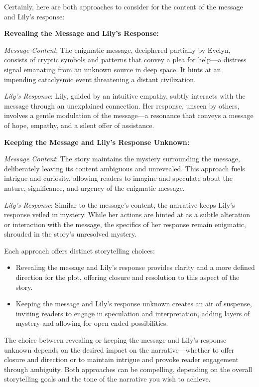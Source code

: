 \begin{aquote}
    Certainly, here are both approaches to consider for the content of the message and Lily's response:\medskip

    \noindent\textbf{Revealing the Message and Lily's Response:}\smallskip

    \emph{Message Content}: The enigmatic message, deciphered partially by Evelyn, consists of cryptic symbols and patterns that convey a plea for help—a distress signal emanating from an unknown source in deep space. It hints at an impending cataclysmic event threatening a distant civilization.\smallskip

    \emph{Lily's Response}: Lily, guided by an intuitive empathy, subtly interacts with the message through an unexplained connection. Her response, unseen by others, involves a gentle modulation of the message—a resonance that conveys a message of hope, empathy, and a silent offer of assistance.\medskip

    \noindent\textbf{Keeping the Message and Lily's Response Unknown:}\smallskip

    \emph{Message Content}: The story maintains the mystery surrounding the message, deliberately leaving its content ambiguous and unrevealed. This approach fuels intrigue and curiosity, allowing readers to imagine and speculate about the nature, significance, and urgency of the enigmatic message.\smallskip

    \emph{Lily's Response}: Similar to the message's content, the narrative keeps Lily's response veiled in mystery. While her actions are hinted at as a subtle alteration or interaction with the message, the specifics of her response remain enigmatic, shrouded in the story's unresolved mystery.\medskip

    Each approach offers distinct storytelling choices:
    \begin{itemize}
        \item Revealing the message and Lily's response provides clarity and a more defined direction for the plot, offering closure and resolution to this aspect of the story.
        \item Keeping the message and Lily's response unknown creates an air of suspense, inviting readers to engage in speculation and interpretation, adding layers of mystery and allowing for open-ended possibilities.
    \end{itemize}

    The choice between revealing or keeping the message and Lily's response unknown depends on the desired impact on the narrative—whether to offer closure and direction or to maintain intrigue and provoke reader engagement through ambiguity. Both approaches can be compelling, depending on the overall storytelling goals and the tone of the narrative you wish to achieve.
\end{aquote}

